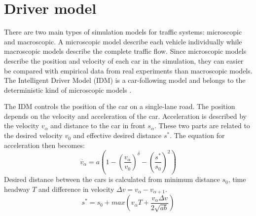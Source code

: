 \section{Driver model}
There are two main types of simulation models for traffic systems: microscopic
and macroscopic. A microscopic model describe each vehicle individually while macroscopic
models describe the complete traffic flow. Since microscopic models describe the position
and velocity of each car in the simulation, they can easier be compared with
empirical data from real experiments than macroscopic models. The Intelligent Driver Model (IDM)
is a car-following model and belongs to the deterministic kind of microscopic
models \cite{idm}.

The IDM controls the position of the car on a single-lane road. The position depends on the velocity and acceleration of the car. Acceleration is described by the velocity \begin{math}v_\alpha\end{math} and distance to the car in front \begin{math}s_\alpha\end{math}. These two parts are related to the desired velocity \begin{math}v_0\end{math} and effective desired distance \begin{math}s^\ast\end{math}. The equation for acceleration then becomes:
\begin{equation}\label{driver_acc}\dot{v_\alpha} = a\left
(1-(\frac{v_\alpha}{v_0})^\delta-(\frac{s^\ast}{s_0})^2 \right)\end{equation}
Desired distance between the cars is calculated from minimum distance \begin{math}s_0\end{math}, time headway \begin{math}T\end{math} and difference in velocity \begin{math}\Delta v = v_\alpha - v_{\alpha + 1}\end{math}.
\begin{equation}\label{desireddist}s^\ast = s_0 + max \left (v_\alpha T +
\frac{v_\alpha \Delta v}{2\sqrt{ab}}\right )\end{equation}
